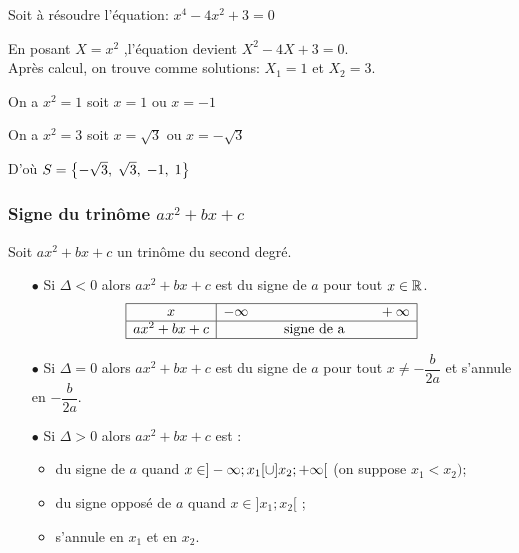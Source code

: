 \begin{example}

Soit à résoudre l'équation: $ x^{4}-4x^{2}+3=0 $
\end{example}

En posant $ X=x^{2} $ ,\;l'équation devient  $ X^{2}-4X+3=0 $.\\Après calcul, on trouve comme solutions:\;  $ X_{1} =1$\;  et\;  $ X_{2}=3 $.
\medskip

On a  $ x^{2}=1 $ soit $ x=1 $ ou $ x=-1 $

\medskip
On a  $ x^{2}=3 $ soit $ x=\sqrt{3} $ ou $ x=-\sqrt{3} $ 

\medskip
D'où  $ S=\left\{-\sqrt{3},\;\sqrt{3},\;-1,\;1\right\} $


\subsubsection*{Signe du trinôme $ax^2+bx+c$}
\begin{property}

Soit $ax^2+bx+c$ un trinôme  du second degré.
\begin{itemize}
	\item[$ \bullet $] Si $ \Delta <0 $ alors $ax^2+bx+c$ est  du signe de $a$ pour tout $x\in\mathbb{R}$.
	\renewcommand{\arraystretch}{1}
  \[\begin{array}{|c|c|}
\hline
x   &-\infty~~~~~~~~~~~~\qquad   \qquad ~~~~+\infty\\ 
\hline
 ax^{2}+bx+c &   \text{signe\ de\ a }\\
\hline
\end{array}\]
	\item[$ \bullet $] Si $ \Delta =0 $ alors $ax^2+bx+c$ est  du signe de $a$ pour tout $x\neq-\dfrac{b}{2a}$ et s'annule en $-\dfrac{b}{2a}$.
	
	\item[$ \bullet $] Si $ \Delta  > 0 $ alors  $ax^2+bx+c$ est :
\begin{itemize}
	\item  du signe de $a$ quand $x\in ]-\infty;x_1[\cup]x_2;+\infty[$ \; (on suppose $ x_{1} < x_{2})$;
	\item du signe opposé de $a$ quand $x\in]x_1;x_2[$ ;
	\item s'annule en $x_1$ et en $x_2$.
\end{itemize}
\end{itemize}
\end{property}

